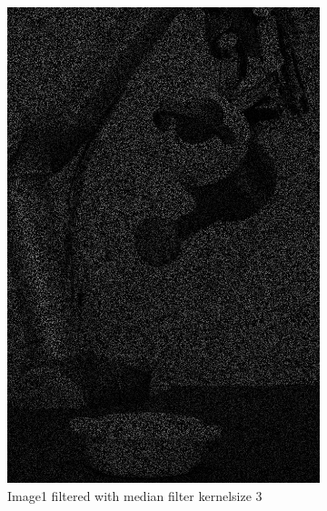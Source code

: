 \begin{figure}[H]
\begin{subfigure}[b]{0.27\textwidth}
        \includegraphics[width=\textwidth]{img1/img_1_medianBlur_3.png}
        \caption{Image1 filtered with median filter kernelsize 3}
        \label{fig:img1_median3}
    \end{subfigure}
       \begin{subfigure}[b]{0.27\textwidth}

\end{subfigure}
\end{figure}
